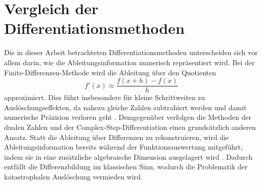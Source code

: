 %
%
%
%
\section{Vergleich der Differentiationsmethoden
\label{step:section:Einordnung}}


Die in dieser Arbeit betrachteten Differentiationsmethoden unterscheiden sich vor allem darin, wie die Ableitungsinformation numerisch repräsentiert wird.
Bei der Finite-Dif\-fe\-ren\-zen-Methode wird die Ableitung über den Quotienten
\begin{equation*}
	f'(x) \approx \frac{f(x+h)-f(x)}{h}
\end{equation*}
approximiert.
Dies führt insbesondere für kleine Schrittweiten zu Auslöschungseffekten, da nahezu gleiche Zahlen subtrahiert werden und damit numerische Präzision verloren geht \cite{step:higham2002,step:squire1998}.
Demgegenüber verfolgen die Methoden der dualen Zahlen und der Complex-Step-Differentiation einen grundsätzlich anderen Ansatz.
Statt die Ableitung über Differenzen zu rekonstruieren, wird die Ableitungsinformation bereits während der Funktionsauswertung mitgeführt, indem sie in eine zusätzliche algebraische Dimension ausgelagert wird \cite{step:baydin2018,step:martins2003}.
Dadurch entfällt die Differenzbildung im klassischen Sinn, wodurch die Problematik der katastrophalen Auslöschung vermieden wird.


